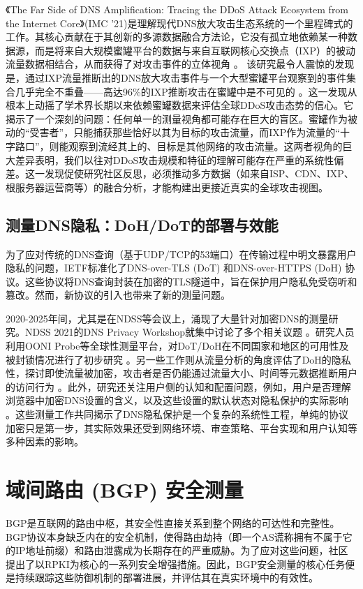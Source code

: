 \documentclass[conference]{IEEEtran}
\begin{document}
《The Far Side of DNS Amplification: Tracing the DDoS Attack Ecosystem from the Internet Core》(IMC '21)是理解现代DNS放大攻击生态系统的一个里程碑式的工作。其核心贡献在于其创新的多源数据融合方法论，它没有孤立地依赖某一种数据源，而是将来自大规模蜜罐平台的数据与来自互联网核心交换点（IXP）的被动流量数据相结合，从而获得了对攻击事件的立体视角 。 该研究最令人震惊的发现是，通过IXP流量推断出的DNS放大攻击事件与一个大型蜜罐平台观察到的事件集合几乎完全不重叠——高达96\%的IXP推断攻击在蜜罐中是不可见的 。这一发现从根本上动摇了学术界长期以来依赖蜜罐数据来评估全球DDoS攻击态势的信心。它揭示了一个深刻的问题：任何单一的测量视角都可能存在巨大的盲区。蜜罐作为被动的“受害者”，只能捕获那些恰好以其为目标的攻击流量，而IXP作为流量的“十字路口”，则能观察到流经其上的、目标是其他网络的攻击流量。这两者视角的巨大差异表明，我们以往对DDoS攻击规模和特征的理解可能存在严重的系统性偏差。这一发现促使研究社区反思，必须推动多方数据（如来自ISP、CDN、IXP、根服务器运营商等）的融合分析，才能构建出更接近真实的全球攻击视图。
\subsection{测量DNS隐私：DoH/DoT的部署与效能}

为了应对传统的DNS查询（基于UDP/TCP的53端口）在传输过程中明文暴露用户隐私的问题，IETF标准化了DNS-over-TLS (DoT) 和DNS-over-HTTPS (DoH) 协议。这些协议将DNS查询封装在加密的TLS隧道中，旨在保护用户隐私免受窃听和篡改。然而，新协议的引入也带来了新的测量问题。

2020-2025年间，尤其是在NDSS等会议上，涌现了大量针对加密DNS的测量研究。NDSS 2021的DNS Privacy Workshop就集中讨论了多个相关议题 。研究人员利用OONI Probe等全球性测量平台，对DoT/DoH在不同国家和地区的可用性及被封锁情况进行了初步研究 。另一些工作则从流量分析的角度评估了DoH的隐私性，探讨即使流量被加密，攻击者是否仍能通过流量大小、时间等元数据推断用户的访问行为 。此外，研究还关注用户侧的认知和配置问题，例如，用户是否理解浏览器中加密DNS设置的含义，以及这些设置的默认状态对隐私保护的实际影响 。这些测量工作共同揭示了DNS隐私保护是一个复杂的系统性工程，单纯的协议加密只是第一步，其实际效果还受到网络环境、审查策略、平台实现和用户认知等多种因素的影响。

\section{域间路由 (BGP) 安全测量}
BGP是互联网的路由中枢，其安全性直接关系到整个网络的可达性和完整性。BGP协议本身缺乏内在的安全机制，使得路由劫持（即一个AS谎称拥有不属于它的IP地址前缀）和路由泄露成为长期存在的严重威胁。为了应对这些问题，社区提出了以RPKI为核心的一系列安全增强措施。因此，BGP安全测量的核心任务便是持续跟踪这些防御机制的部署进展，并评估其在真实环境中的有效性。
\end{document}
